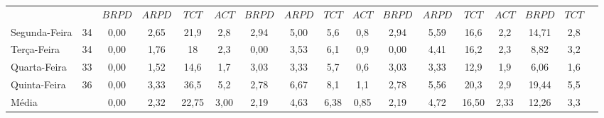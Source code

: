 \begin{landscape}
\begin{table}[H]
\begin{tabular}{llccccccccccccccc}
                     & \multicolumn{1}{l|}{}                       & $BRPD$               & $ARPD$               & $TCT$                        & \multicolumn{1}{c|}{$ACT$} & $BRPD$               & $ARPD$               & $TCT$                      & \multicolumn{1}{c|}{$ACT$} & $BRPD$               & $ARPD$               & $TCT$                      & \multicolumn{1}{c|}{$ACT$} & $BRPD$               & $TCT$                &                      \\ \cline{1-16}
Segunda-Feira        & \multicolumn{1}{l|}{34}                     & 0,00                 & 2,65                 & 21,9                         & \multicolumn{1}{c|}{2,8}   & 2,94                 & 5,00                 & 5,6                        & \multicolumn{1}{c|}{0,8}   & 2,94                 & 5,59                 & 16,6                       & \multicolumn{1}{c|}{2,2}   & 14,71                & 2,8                  &                      \\
Terça-Feira          & \multicolumn{1}{l|}{34}                     & 0,00                 & 1,76                 & 18                           & \multicolumn{1}{c|}{2,3}   & 0,00                 & 3,53                 & 6,1                        & \multicolumn{1}{c|}{0,9}   & 0,00                 & 4,41                 & 16,2                       & \multicolumn{1}{c|}{2,3}   & 8,82                 & 3,2                  &                      \\
Quarta-Feira         & \multicolumn{1}{l|}{33}                     & 0,00                 & 1,52                 & 14,6                         & \multicolumn{1}{c|}{1,7}   & 3,03                 & 3,33                 & 5,7                        & \multicolumn{1}{c|}{0,6}   & 3,03                 & 3,33                 & 12,9                       & \multicolumn{1}{c|}{1,9}   & 6,06                 & 1,6                  &                      \\
Quinta-Feira         & \multicolumn{1}{l|}{36}                     & 0,00                 & 3,33                 & 36,5                         & \multicolumn{1}{c|}{5,2}   & 2,78                 & 6,67                 & 8,1                        & \multicolumn{1}{c|}{1,1}   & 2,78                 & 5,56                 & 20,3                       & \multicolumn{1}{c|}{2,9}   & 19,44                & 5,5                  &                      \\ \cline{1-16}
Média                & \multicolumn{1}{l|}{}                       & 0,00                 & 2,32                 & 22,75                        & \multicolumn{1}{c|}{3,00}  & 2,19                 & 4,63                 & 6,38                       & \multicolumn{1}{c|}{0,85}  & 2,19                 & 4,72                 & 16,50                      & \multicolumn{1}{c|}{2,33}  & 12,26                & 3,3                  &                     
\end{tabular}
\end{table}
\end{landscape}

